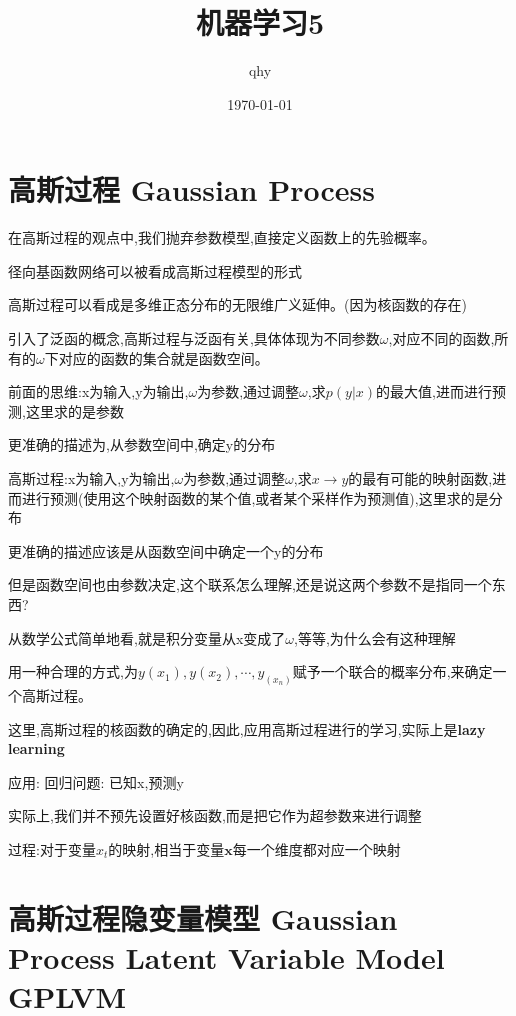 \documentclass[UTF8,a4paper]{ctexart}%
\author{qhy}%
\date{\today}%
\title{机器学习5}%
\begin{document}
  \maketitle
  \tableofcontents
  \newpage

  \section{高斯过程 Gaussian Process}
    在高斯过程的观点中,我们抛弃参数模型,直接定义函数上的先验概率。

    径向基函数网络可以被看成高斯过程模型的形式

    高斯过程可以看成是多维正态分布的无限维广义延伸。(因为核函数的存在)

    引入了泛函的概念,高斯过程与泛函有关,具体体现为不同参数$\omega$,对应不同的函数,所有的$\omega$下对应的函数的集合就是函数空间。

    前面的思维:x为输入,y为输出,$\omega$为参数,通过调整$\omega$,求$p(y|x)$的最大值,进而进行预测,这里求的是参数

    更准确的描述为,从参数空间中,确定y的分布

    高斯过程:x为输入,y为输出,$\omega$为参数,通过调整$\omega$,求$x\to y$的最有可能的映射函数,进而进行预测(使用这个映射函数的某个值,或者某个采样作为预测值),这里求的是分布

    更准确的描述应该是从函数空间中确定一个y的分布

    但是函数空间也由参数决定,这个联系怎么理解,还是说这两个参数不是指同一个东西?

    从数学公式简单地看,就是积分变量从x变成了$\omega$,等等,为什么会有这种理解

    用一种合理的方式,为$y(x_1) , y(x_2) , \cdots, y_(x_n)$赋予一个联合的概率分布,来确定一个高斯过程。

    这里,高斯过程的核函数的确定的,因此,应用高斯过程进行的学习,实际上是\textbf{lazy learning}

    应用:
    回归问题:
    已知x,预测y

    实际上,我们并不预先设置好核函数,而是把它作为超参数来进行调整

    过程:对于变量$x_t$的映射,相当于变量$\bm{x}$每一个维度都对应一个映射

    \section{高斯过程隐变量模型 Gaussian Process Latent Variable Model GPLVM}
\end{document}
